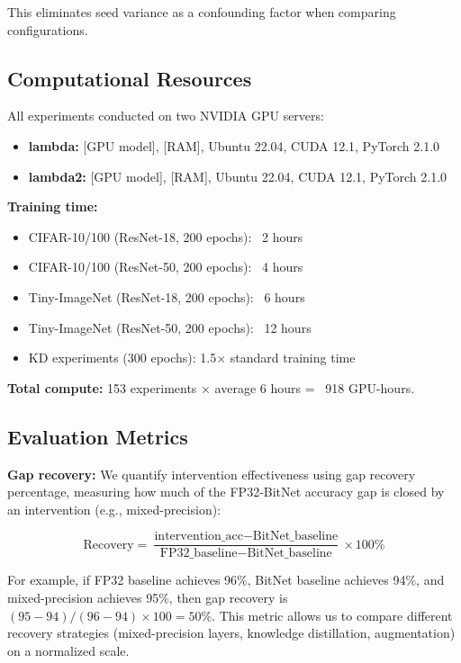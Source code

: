 This eliminates seed variance as a confounding factor when comparing configurations.

\subsection{Computational Resources}
\label{sec:methods:compute}

All experiments conducted on two NVIDIA GPU servers:
\begin{itemize}
    \item \textbf{lambda:} [GPU model], [RAM], Ubuntu 22.04, CUDA 12.1, PyTorch 2.1.0
    \item \textbf{lambda2:} [GPU model], [RAM], Ubuntu 22.04, CUDA 12.1, PyTorch 2.1.0
\end{itemize}

\textbf{Training time:}
\begin{itemize}
    \item CIFAR-10/100 (ResNet-18, 200 epochs): ~2 hours
    \item CIFAR-10/100 (ResNet-50, 200 epochs): ~4 hours
    \item Tiny-ImageNet (ResNet-18, 200 epochs): ~6 hours
    \item Tiny-ImageNet (ResNet-50, 200 epochs): ~12 hours
    \item KD experiments (300 epochs): 1.5× standard training time
\end{itemize}

\textbf{Total compute:} 153 experiments × average 6 hours = ~918 GPU-hours.

\subsection{Evaluation Metrics}
\label{sec:methods:metrics}

\textbf{Gap recovery:} We quantify intervention effectiveness using gap recovery percentage, measuring how much of the FP32-BitNet accuracy gap is closed by an intervention (e.g., mixed-precision):

\begin{equation}
\text{Recovery} = \frac{\text{intervention\_acc} - \text{BitNet\_baseline}}{\text{FP32\_baseline} - \text{BitNet\_baseline}} \times 100\%
\end{equation}

For example, if FP32 baseline achieves 96\%, BitNet baseline achieves 94\%, and mixed-precision achieves 95\%, then gap recovery is $(95-94)/(96-94) \times 100 = 50\%$. This metric allows us to compare different recovery strategies (mixed-precision layers, knowledge distillation, augmentation) on a normalized scale.

